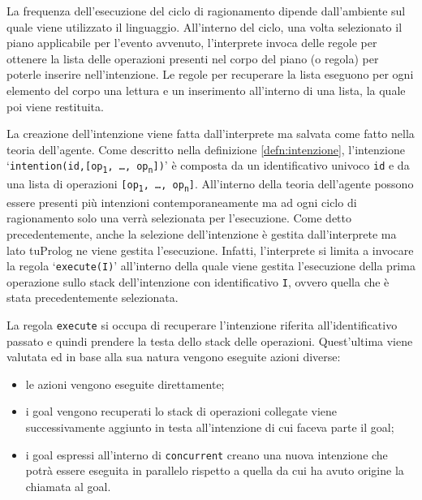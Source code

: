 La frequenza dell'esecuzione del ciclo di ragionamento dipende dall'ambiente sul quale viene utilizzato il linguaggio. All'interno del ciclo, una volta selezionato il piano applicabile per l'evento avvenuto, l'interprete invoca delle regole per ottenere la lista delle operazioni presenti nel corpo del piano (o regola) per poterle inserire nell'intenzione. Le regole per recuperare la lista eseguono per ogni elemento del corpo una lettura e un inserimento all'interno di una lista, la quale poi viene restituita.

La creazione dell'intenzione viene fatta dall'interprete ma salvata come fatto nella teoria dell'agente. Come descritto nella definizione \ref{defn:intenzione}, l'intenzione `\texttt{in\-ten\-tion(id,[op\textsubscript{1}, \ldots, op\textsubscript{n}])}' è composta da un identificativo univoco \texttt{id} e da una lista di operazioni \texttt{[op\textsubscript{1}, \ldots, op\textsubscript{n}]}. All'interno della teoria dell'agente possono essere presenti più intenzioni contemporaneamente ma ad ogni ciclo di ragionamento solo una verrà selezionata per l'esecuzione.
Come detto precedentemente, anche la selezione dell'intenzione è gestita dall'interprete ma lato tuProlog ne viene gestita l'esecuzione. Infatti, l'interprete si limita a invocare la regola `\texttt{execute(I)}' all'interno della quale viene gestita l'esecuzione della prima operazione sullo stack dell'intenzione con identificativo \texttt{I}, ovvero quella che è stata precedentemente selezionata.

La regola \texttt{execute} si occupa di recuperare l'intenzione riferita all'identificativo passato e quindi prendere la testa dello stack delle operazioni. Quest'ultima viene valutata ed in base alla sua natura vengono eseguite azioni diverse:
\begin{itemize}
\item le azioni vengono eseguite direttamente;
\item i goal vengono recuperati lo stack di operazioni collegate viene successivamente aggiunto in testa all'intenzione di cui faceva parte il goal;
\item i goal espressi all'interno di \texttt{concurrent} creano una nuova intenzione che potrà essere eseguita in parallelo rispetto a quella da cui ha avuto origine la chiamata al goal.
\end{itemize}


